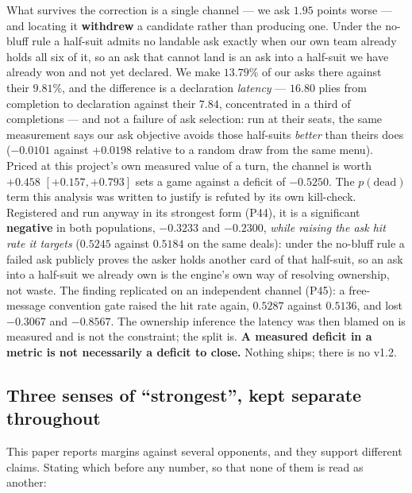 \documentclass[11pt,letterpaper]{article}
\begin{document}
What survives the correction is a single channel --- we ask $1.95$ points
worse --- and locating it \textbf{withdrew} a candidate rather than producing
one. Under the no-bluff rule a half-suit admits no landable ask exactly when
our own team already holds all six of it, so an ask that cannot land is an ask
into a half-suit we have already won and not yet declared. We make
$\mathbf{13.79\%}$ of our asks there against their $9.81\%$, and the difference
is a declaration \emph{latency} --- $16.80$ plies from completion to
declaration against their $7.84$, concentrated in a third of completions --- and
not a failure of ask selection: run at their seats, the same measurement says
our ask objective avoids those half-suits \emph{better} than theirs does
($-0.0101$ against $+0.0198$ relative to a random draw from the same menu).
Priced at this project's own measured value of a turn, the channel is worth
$+0.458$ $[+0.157, +0.793]$ sets a game against a deficit of $-0.5250$. The
$p(\text{dead})$ term this analysis was written to justify is refuted by its
own kill-check. Registered and run anyway in its strongest form (P44), it is a
significant \textbf{negative} in both populations, $-0.3233$ and $-0.2300$,
\emph{while raising the ask hit rate it targets} ($0.5245$ against $0.5184$ on
the same deals): under the no-bluff rule a failed ask publicly proves the asker
holds another card of that half-suit, so an ask into a half-suit we already own
is the engine's own way of resolving ownership, not waste. The finding
replicated on an independent channel (P45): a free-message convention gate
raised the hit rate again, $0.5287$ against $0.5136$, and lost $-0.3067$ and
$-0.8567$. The ownership inference the latency was then blamed on is measured
and is not the constraint; the split is. \textbf{A measured
deficit in a metric is not necessarily a deficit to close.} Nothing ships;
there is no v1.2.

\subsection{Three senses of ``strongest'', kept separate throughout}
\label{sec:senses}

This paper reports margins against several opponents, and they support
different claims. Stating which before any number, so that none of them is
read as another:
\end{document}
